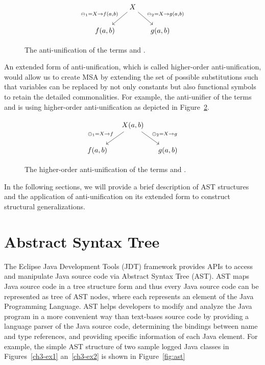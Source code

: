 \begin{figure} [H]
\[
\begin{tikzcd}[column sep=small] 
&  
  X
  \arrow{dr}{\ominus_2 = X \rightarrow g(a,b)}
  \arrow[->,swap]{dl}{\ominus_1 = X \rightarrow f(a,b)} %
\\
f(a,b)
&&
g(a,b)  
\end{tikzcd}
\]
  \caption{The anti-unification of the terms  and .}
  \label{fig:first-anti-uni}
\end{figure}

An extended form of anti-unification, which is called higher-order anti-unification, would allow us to create MSA by extending the set of possible substitutions such that variables can be replaced by not only constants but also functional symbols to retain the detailed commonalities. For example, the anti-unifier of the terms  and  is  using higher-order anti-unification as depicted in Figure~\ref{fig:higher-anti-uni}.
\begin{figure} [H]
\[
\begin{tikzcd}[column sep=small] 
&  
  X(a,b)
  \arrow{dr}{\ominus_2 = X \rightarrow g}
  \arrow[->,swap]{dl}{\ominus_1 = X \rightarrow f} %
\\
f(a,b)
&&
g(a,b)  
\end{tikzcd}
\]
  \caption{The higher-order anti-unification of the terms  and .}
  \label{fig:higher-anti-uni}
\end{figure}

In the following sections, we will provide a brief description of AST structures and the application of anti-unification on its extended form to construct structural generalizations.

\section{Abstract Syntax Tree}   \label{AST}
The Eclipse Java Development Tools (JDT) framework provides APIs to access and manipulate Java source code via Abstract Syntax Tree (AST). AST maps Java source code in a tree structure form and thus every Java source code can be represented as tree of AST nodes, where each represents an element of the Java Programming Language. AST helps developers to modify and analyze the Java program in a more convenient way than text-bases source code by providing a language parser of the Java source code, determining the bindings between name and type references, and providing specific information of each Java element. For example, the simple AST structure of two sample logged Java classes in Figures~\ref{ch3-ex1} an~\ref{ch3-ex2} is shown in Figure~\ref{fig:ast}

